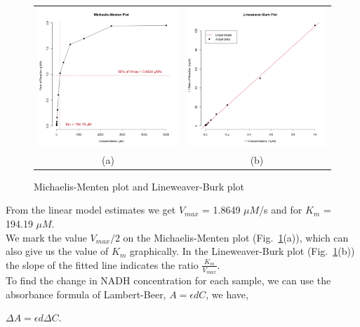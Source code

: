 \documentclass[a4paper,11pt]{article}
\begin{document}
                \begin{figure}[H]
                    \centering
                    \begin{tabular}{cc}
                        \includegraphics[width=220px]{../resources/kinetics_mmplot.png} &
                        \includegraphics[width=220px]{../resources/kinetics_lbplot.png} \\
                        (a) & (b)\\
                    \end{tabular}
                    \caption{Michaelis-Menten plot and Lineweaver-Burk plot}\label{fig:mm_plot}
                \end{figure}

                \noindent From the linear model estimates we get $V_{max}$ = 1.8649 $\mu M$/s and for $K_m$ = 194.19 $\mu M$.\\
                We mark the value $V_{max}/2$ on the Michaelis-Menten plot (Fig.~\ref{fig:mm_plot}(a)), which can
                also give us the value of $K_m$ graphically. 
                In the Lineweaver-Burk plot (Fig.~\ref{fig:mm_plot}(b)) the slope of the fitted line indicates 
                the ratio $\frac{K_m}{V_{max}}$.\\

                To find the change in NADH concentration for each sample, we can use the absorbance formula
                of Lambert-Beer, $A = \epsilon d C$, we have,
                \begin{center}
                    $\Delta A = \epsilon d \Delta C$.
                \end{center}
\end{document}
